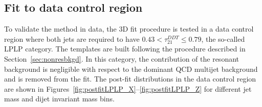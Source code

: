 \subsection{Fit to data control region}
To validate the method in data, the 3D fit procedure is tested in a data control region where both jets are required to have $0.43<\tau_{21}^{DDT}\leq0.79$, the so-called LPLP category. The templates are built following the procedure described in Section~\ref{sec:nonresbkgd}. In this category, the contribution of the resonant background is negligible with respect to the dominant QCD multijet background and is removed from the fit. The post-fit distributions in the data control region are shown in Figures~\ref{fig:postfitLPLP_X}--\ref{fig:postfitLPLP_Z} for different jet mass and dijet invariant mass bins.
\begin{figure}[h!]
\centering
{}

\end{figure}
